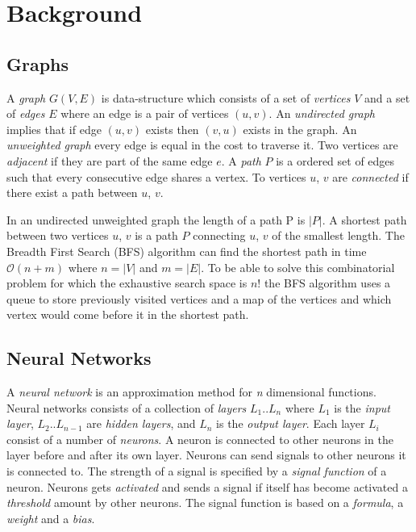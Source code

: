 
\section{Background}
\subsection{Graphs}
A \textit{graph} $G(V,E)$ is data-structure which consists of a set of \textit{vertices} $V$ and a set of \textit{edges} $E$ where an edge is a pair of vertices $(u,v)$. An \textit{undirected graph} implies that if edge $ (u,v) $ exists then $ (v,u) $ exists in the graph. An \textit{unweighted graph} every edge is equal in the cost to traverse it.
Two vertices are \textit{adjacent} if they are part of the same edge $ e $. A \textit{path} $ P $ is a ordered set of edges such that every consecutive edge shares a vertex. To vertices $ u $, $ v $ are \textit{connected} if there exist a path between $ u $, $ v $.

\newpar In an undirected unweighted graph the length of a path P is $|P|$. A shortest path between two vertices  $u$, $v$ is a path $P$ connecting  $u$, $v$ of the smallest length. The Breadth First Search (BFS) algorithm can find the shortest path in time $\mathcal{O}(n+m)$ where $n=|V|$ and $m=|E|$. To be able to solve this combinatorial problem for which the exhaustive search space is $n!$ the BFS algorithm uses a queue to store previously visited vertices and a map of the vertices and which vertex would come before it in the shortest path.

\subsection{Neural Networks}
A \textit{neural network} is an approximation method for \textit{n} dimensional functions. Neural networks consists of a collection of \textit{layers} $L_1 .. L_n$ where $L_1$ is the \textit{input layer}, $L_2 .. L_{n-1}$ are \textit{hidden layers}, and $L_n$ is the \textit{output layer}. Each layer $L_i$ consist of a number of \textit{neurons}. A neuron is connected to other neurons in the layer before and after its own layer. Neurons can send signals to other neurons it is connected to. The strength of a signal is specified by a \textit{signal function} of a neuron. Neurons gets \textit{activated} and sends a signal if itself has become activated a \textit{threshold} amount by other neurons. The signal function is based on a \textit{formula}, a \textit{weight} and a \textit{bias}. 

